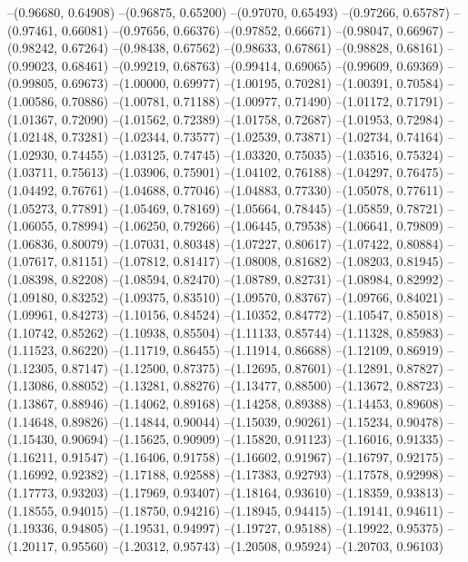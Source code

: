 --(0.96680, 0.64908)
--(0.96875, 0.65200)
--(0.97070, 0.65493)
--(0.97266, 0.65787)
--(0.97461, 0.66081)
--(0.97656, 0.66376)
--(0.97852, 0.66671)
--(0.98047, 0.66967)
--(0.98242, 0.67264)
--(0.98438, 0.67562)
--(0.98633, 0.67861)
--(0.98828, 0.68161)
--(0.99023, 0.68461)
--(0.99219, 0.68763)
--(0.99414, 0.69065)
--(0.99609, 0.69369)
--(0.99805, 0.69673)
--(1.00000, 0.69977)
--(1.00195, 0.70281)
--(1.00391, 0.70584)
--(1.00586, 0.70886)
--(1.00781, 0.71188)
--(1.00977, 0.71490)
--(1.01172, 0.71791)
--(1.01367, 0.72090)
--(1.01562, 0.72389)
--(1.01758, 0.72687)
--(1.01953, 0.72984)
--(1.02148, 0.73281)
--(1.02344, 0.73577)
--(1.02539, 0.73871)
--(1.02734, 0.74164)
--(1.02930, 0.74455)
--(1.03125, 0.74745)
--(1.03320, 0.75035)
--(1.03516, 0.75324)
--(1.03711, 0.75613)
--(1.03906, 0.75901)
--(1.04102, 0.76188)
--(1.04297, 0.76475)
--(1.04492, 0.76761)
--(1.04688, 0.77046)
--(1.04883, 0.77330)
--(1.05078, 0.77611)
--(1.05273, 0.77891)
--(1.05469, 0.78169)
--(1.05664, 0.78445)
--(1.05859, 0.78721)
--(1.06055, 0.78994)
--(1.06250, 0.79266)
--(1.06445, 0.79538)
--(1.06641, 0.79809)
--(1.06836, 0.80079)
--(1.07031, 0.80348)
--(1.07227, 0.80617)
--(1.07422, 0.80884)
--(1.07617, 0.81151)
--(1.07812, 0.81417)
--(1.08008, 0.81682)
--(1.08203, 0.81945)
--(1.08398, 0.82208)
--(1.08594, 0.82470)
--(1.08789, 0.82731)
--(1.08984, 0.82992)
--(1.09180, 0.83252)
--(1.09375, 0.83510)
--(1.09570, 0.83767)
--(1.09766, 0.84021)
--(1.09961, 0.84273)
--(1.10156, 0.84524)
--(1.10352, 0.84772)
--(1.10547, 0.85018)
--(1.10742, 0.85262)
--(1.10938, 0.85504)
--(1.11133, 0.85744)
--(1.11328, 0.85983)
--(1.11523, 0.86220)
--(1.11719, 0.86455)
--(1.11914, 0.86688)
--(1.12109, 0.86919)
--(1.12305, 0.87147)
--(1.12500, 0.87375)
--(1.12695, 0.87601)
--(1.12891, 0.87827)
--(1.13086, 0.88052)
--(1.13281, 0.88276)
--(1.13477, 0.88500)
--(1.13672, 0.88723)
--(1.13867, 0.88946)
--(1.14062, 0.89168)
--(1.14258, 0.89388)
--(1.14453, 0.89608)
--(1.14648, 0.89826)
--(1.14844, 0.90044)
--(1.15039, 0.90261)
--(1.15234, 0.90478)
--(1.15430, 0.90694)
--(1.15625, 0.90909)
--(1.15820, 0.91123)
--(1.16016, 0.91335)
--(1.16211, 0.91547)
--(1.16406, 0.91758)
--(1.16602, 0.91967)
--(1.16797, 0.92175)
--(1.16992, 0.92382)
--(1.17188, 0.92588)
--(1.17383, 0.92793)
--(1.17578, 0.92998)
--(1.17773, 0.93203)
--(1.17969, 0.93407)
--(1.18164, 0.93610)
--(1.18359, 0.93813)
--(1.18555, 0.94015)
--(1.18750, 0.94216)
--(1.18945, 0.94415)
--(1.19141, 0.94611)
--(1.19336, 0.94805)
--(1.19531, 0.94997)
--(1.19727, 0.95188)
--(1.19922, 0.95375)
--(1.20117, 0.95560)
--(1.20312, 0.95743)
--(1.20508, 0.95924)
--(1.20703, 0.96103)
